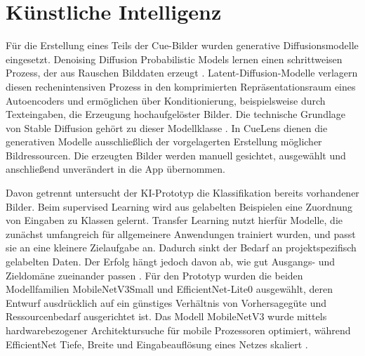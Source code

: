 \section{Künstliche Intelligenz}

Für die Erstellung eines Teils der Cue-Bilder wurden generative Diffusionsmodelle eingesetzt. Denoising Diffusion Probabilistic Models lernen einen schrittweisen Prozess, der aus Rauschen Bilddaten erzeugt \cite{ho_diffusion_2020}. Latent-Diffusion-Modelle verlagern diesen rechenintensiven Prozess in den komprimierten Repräsentationsraum eines Autoencoders und ermöglichen über Konditionierung, beispielsweise durch Texteingaben, die Erzeugung hochaufgelöster Bilder. Die technische Grundlage von Stable Diffusion gehört zu dieser Modellklasse \cite{rombach_latent_diffusion_2022}. In CueLens dienen die generativen Modelle ausschließlich der vorgelagerten Erstellung möglicher Bildressourcen. Die erzeugten Bilder werden manuell gesichtet, ausgewählt und anschließend unverändert in die App übernommen. 

Davon getrennt untersucht der KI-Prototyp die Klassifikation bereits vorhandener Bilder. Beim supervised Learning wird aus gelabelten Beispielen eine Zuordnung von Eingaben zu Klassen gelernt. Transfer Learning nutzt hierfür Modelle, die zunächst umfangreich für allgemeinere Anwendungen trainiert wurden, und passt sie an eine kleinere Zielaufgabe an. Dadurch sinkt der Bedarf an projektspezifisch gelabelten Daten. Der Erfolg hängt jedoch davon ab, wie gut Ausgangs- und Zieldomäne zueinander passen \cite{pan_transfer_learning_2010}. Für den Prototyp wurden die beiden Modellfamilien MobileNetV3Small und EfficientNet-Lite0 ausgewählt, deren Entwurf ausdrücklich auf ein günstiges Verhältnis von Vorhersagegüte und Ressourcenbedarf ausgerichtet ist. Das Modell MobileNetV3 wurde mittels hardwarebezogener Architektursuche für mobile Prozessoren optimiert, während EfficientNet Tiefe, Breite und Eingabeauflösung eines Netzes skaliert \cite{howard_mobilenetv3_2019,tan_efficientnet_2019}.
